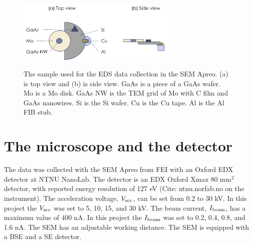 \begin{figure}[ht]
    \centering
    \colorbox{white}{\includegraphics[width=0.7\textwidth]{figures/Materials-sample1.png}}
    \caption{
        The sample used for the EDS data collection in the SEM Apreo.
        (a) is top view and (b) is side view.
        GaAs is a piece of a GaAs wafer.
        Mo is a Mo disk.
        GaAs NW is the TEM grid of Mo with C film and GaAs nanowires.
        Si is the Si wafer.
        Cu is the Cu tape.
        Al is the Al FIB stub.
    }
    \label{fig:method:materials:sample1}
\end{figure}



%
%
\section{The microscope and the detector}
\label{sec:method:detector}
The data was collected with the SEM Apreo from FEI with an Oxford EDX detector at NTNU NanoLab.
The detector is an EDX Oxford Xmax 80 mm$^2$ detector, with reported energy resolution of 127 eV (Cite: ntnu.norfab.no on the instrument).
The acceleration voltage, $V_\textnormal{acc}$, can be set from 0.2 to 30 kV.
In this project the $V_\textnormal{acc}$ was set to 5, 10, 15, and 30 kV.
The beam current, $I_\textnormal{beam}$, has a maximum value of 400 nA.
In this project the $I_\textnormal{beam}$ was set to 0.2, 0.4, 0.8, and 1.6 nA.
The SEM has an adjustable working distance.
The SEM is equipped with a BSE and a SE detector.

